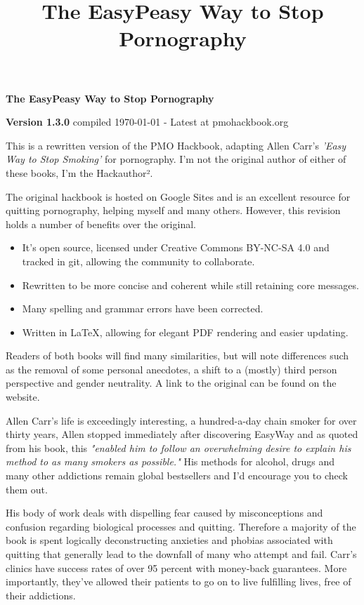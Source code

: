 \documentclass[easypeasy.tex]{subfiles}
\title {The EasyPeasy Way to Stop Pornography}
\begin{document}
\thispagestyle{empty}

\begin{center}
  {\Huge\bfseries The EasyPeasy Way to Stop Pornography \par}
  {\small \textbf{Version 1.3.0} compiled {\today} - Latest at pmohackbook.org}
\end{center}

This is a rewritten version of the PMO Hackbook, adapting Allen Carr's \textit{'Easy Way to Stop Smoking'} for pornography. I'm not the original author of either of these books, I'm the Hackauthor².

The original hackbook is hosted on Google Sites and is an excellent resource for quitting pornography, helping myself and many others. However, this revision holds a number of benefits over the original.
\begin{itemize}
\item It's open source, licensed under Creative Commons BY-NC-SA 4.0 and tracked in git, allowing the community to collaborate.
\item Rewritten to be more concise and coherent while still retaining core messages.
\item Many spelling and grammar errors have been corrected.
\item Written in LaTeX, allowing for elegant PDF rendering and easier updating.
\end{itemize}

Readers of both books will find many similarities, but will note differences such as the removal of some personal anecdotes, a shift to a (mostly) third person perspective and gender neutrality. A link to the original can be found on the website.

Allen Carr's life is exceedingly interesting, a hundred-a-day chain smoker for over thirty years, Allen stopped immediately after discovering EasyWay and as quoted from his book, this \textit{"enabled him to follow an overwhelming desire to explain his method to as many smokers as possible."} His methods for alcohol, drugs and many other addictions remain global bestsellers and I'd encourage you to check them out.

His body of work deals with dispelling fear caused by misconceptions and confusion regarding biological processes and quitting. Therefore a majority of the book is spent logically deconstructing anxieties and phobias associated with quitting that generally lead to the downfall of many who attempt and fail. Carr's clinics have success rates of over 95 percent with money-back guarantees. More importantly, they've allowed their patients to go on to live fulfilling lives, free of their addictions.
\end{document}
